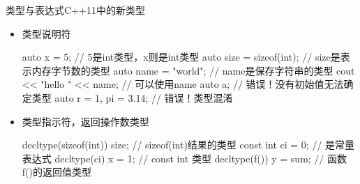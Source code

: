 \begin{frame}[fragile]{类型与表达式}{C++11中的新类型}
  \stretchon
  \begin{itemize}
  \item {}类型说明符\\
    \begin{minipage}{0.95\linewidth}
      \begin{cppcode}
auto x = 5;               // 5是int类型，x则是int类型
auto size = sizeof(int);  // size是表示内存字节数的类型
auto name = "world";      // name是保存字符串的类型
cout << "hello " << name; // 可以使用name
auto a;                   // 错误！没有初始值无法确定类型
auto r = 1, pi = 3.14;    // 错误！类型混淆
     \end{cppcode}
    \end{minipage}
  \item  {}类型指示符，\alert{返回操作数类型}\\
     \begin{minipage}{0.95\linewidth}
      \begin{cppcode}
decltype(sizeof(int)) size; // sizeof(int)结果的类型
const int ci = 0;           // 是常量表达式
decltype(ci) x = 1;         // const int 类型
decltype(f()) y = sum;      // 函数f()的返回值类型
      \end{cppcode}
    \end{minipage}
  \end{itemize}
  \stretchoff
\end{frame}

